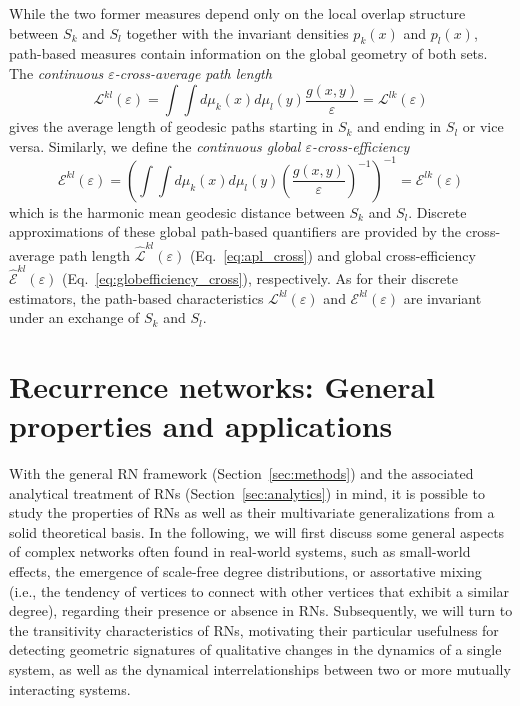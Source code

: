 \documentclass[graybox]{svmult}
\begin{document}
While the two former measures depend only on the local overlap structure between $S_k$ and $S_l$ together with the invariant densities $p_k(x)$ and $p_l(x)$, path-based measures contain information on the global geometry of both sets. The \textit{continuous $\varepsilon$-cross-average path length}
\begin{equation}
\mathcal{L}^{kl}(\varepsilon) = \int\!\!\!\int d\mu_k(x) d\mu_l(y) \frac{g(x,y)}{\varepsilon} = \mathcal{L}^{lk}(\varepsilon)
\end{equation}
gives the average length of geodesic paths starting in $S_k$ and ending in $S_l$ or vice versa. Similarly, we define the \textit{continuous global $\varepsilon$-cross-efficiency} 
\begin{equation}
\mathcal{E}^{kl}(\varepsilon) = \left( \int\!\!\!\int d\mu_k(x) d\mu_l(y) \left( \frac{g(x,y)}{\varepsilon} \right)^{-1} \right)^{-1} = \mathcal{E}^{lk}(\varepsilon)
\end{equation}
which is the harmonic mean geodesic distance between $S_k$ and $S_l$. Discrete approximations of these global path-based quantifiers are provided by the cross-average path length $\hat{\mathcal{L}}^{kl}(\varepsilon)$ (Eq.~\ref{eq:apl_cross}) and global cross-efficiency $\hat{\mathcal{E}}^{kl}(\varepsilon)$ (Eq.~\ref{eq:globefficiency_cross}), respectively. As for their discrete estimators, the path-based characteristics $\mathcal{L}^{kl}(\varepsilon)$ and $\mathcal{E}^{kl}(\varepsilon)$ are invariant under an exchange of $S_k$ and $S_l$.


\section{Recurrence networks: General properties and applications}\label{sec:rn_properties}

With the general RN framework (Section~\ref{sec:methods}) and the associated analytical treatment of RNs (Section~\ref{sec:analytics}) in mind, it is possible to study the properties of RNs as well as their multivariate generalizations from a solid theoretical basis. In the following, we will first discuss some general aspects of complex networks often found in real-world systems, such as small-world effects, the emergence of scale-free degree distributions, or assortative mixing (i.e., the tendency of vertices to connect with other vertices that exhibit a similar degree), regarding their presence or absence in RNs. Subsequently, we will turn to the transitivity characteristics of RNs, motivating their particular usefulness for detecting geometric signatures of qualitative changes in the dynamics of a single system, as well as the dynamical interrelationships between two or more mutually interacting systems.
\end{document}

